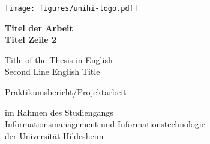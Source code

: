 \documentclass[12pt,        %
  english,ngerman,          %
  paper=a4,                 %
  captions=tablesignature,  %
  listof=numbered,          %
  bibliography=totoc,       %
  headings=small,           %
  headinclude=false,        %
  footinclude=false,        %
  parskip=half-,            %
  oneside,                  %
  BCOR=5mm,                 %
  DIV=12                    %
  ]{scrbook}                %
\begin{document}
\frontmatter



\begin{titlepage}
  \begin{center}
    \texttt{[image: figures/unihi-logo.pdf]}\\

    \vfill

    {
      \Large
      \bfseries
      Titel der Arbeit\\    
      Titel Zeile 2
      
      \vspace{0.25cm}
      \normalsize
      \mdseries
        Title of the Thesis in English\\
        Second Line English Title
    }

    \vfill

    {
      \normalsize

      Praktikumsbericht/Projektarbeit

      im Rahmen des Studiengangs\\
      Informationsmanagement und Informationstechnologie\\
      der Universität Hildesheim

}
\end{center}
\end{titlepage}
\end{document}
